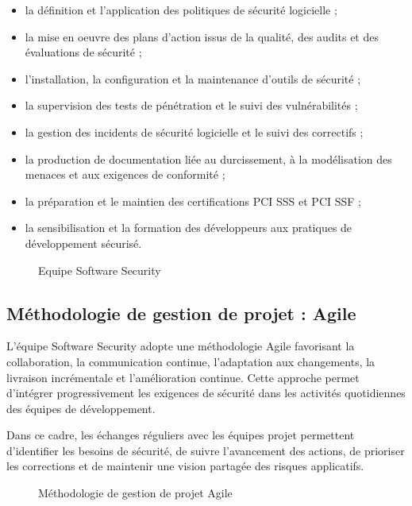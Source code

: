 \begin{itemize}
    \item la définition et l'application des politiques de sécurité logicielle ;
    \item la mise en oeuvre des plans d'action issus de la qualité, des audits et des évaluations de sécurité ;
    \item l'installation, la configuration et la maintenance d'outils de sécurité ;
    \item la supervision des tests de pénétration et le suivi des vulnérabilités ;
    \item la gestion des incidents de sécurité logicielle et le suivi des correctifs ;
    \item la production de documentation liée au durcissement, à la modélisation des menaces et aux exigences de conformité ;
    \item la préparation et le maintien des certifications PCI SSS et PCI SSF ;
    \item la sensibilisation et la formation des développeurs aux pratiques de développement sécurisé.
\end{itemize}

\begin{figure}[h!]
    \centering
    \caption{Equipe Software Security}
    \label{fig:equipe-software-security}
\end{figure}

\subsection{Méthodologie de gestion de projet : Agile}

L'équipe Software Security adopte une méthodologie Agile favorisant la collaboration, la communication continue, l'adaptation aux changements, la livraison incrémentale et l'amélioration continue. Cette approche permet d'intégrer progressivement les exigences de sécurité dans les activités quotidiennes des équipes de développement.

Dans ce cadre, les échanges réguliers avec les équipes projet permettent d'identifier les besoins de sécurité, de suivre l'avancement des actions, de prioriser les corrections et de maintenir une vision partagée des risques applicatifs.

\begin{figure}[h!]
    \centering
    \caption{Méthodologie de gestion de projet Agile}
    \label{fig:agile}
\end{figure}

